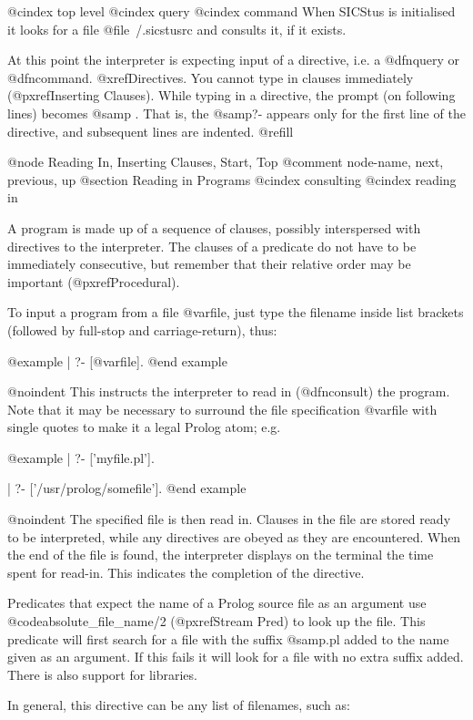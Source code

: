 @cindex top level
@cindex query
@cindex command
When SICStus is initialised it looks for a file @file{~/.sicstusrc} and
consults it, if it exists.

At this point the interpreter is expecting input of a directive, i.e. a
@dfn{query} or @dfn{command}. @xref{Directives}.  You cannot type in
clauses immediately (@pxref{Inserting Clauses}).  While typing in a
directive, the prompt (on following lines) becomes @samp{ }.  That is,
the @samp{?-} appears only for the first line of the directive, and
subsequent lines are indented. @refill

@node Reading In, Inserting Clauses, Start, Top
@comment  node-name,  next,  previous,  up
@section Reading in Programs
@cindex consulting
@cindex reading in

A program is made up of a sequence of clauses, possibly interspersed with
directives to the interpreter.  The clauses of a predicate do not have to
be immediately consecutive, but remember that their relative order may be
important (@pxref{Procedural}).

To input a program from a file @var{file}, just type the filename inside list
brackets (followed by full-stop and carriage-return), thus:

@example
| ?- [@var{file}].
@end example

@noindent
This instructs the interpreter to read in (@dfn{consult}) the program.
Note that it may be necessary to surround the file specification
@var{file} with single quotes to make it a legal Prolog atom; e.g.

@example
| ?- ['myfile.pl'].

| ?- ['/usr/prolog/somefile'].
@end example

@noindent
The specified file is then read in.  Clauses in the file are stored ready
to be interpreted, while any directives are obeyed as they are encountered.
When the end of the file is found, the interpreter displays on the terminal
the time spent for read-in.  This indicates the completion of the directive.

Predicates that expect the name of a Prolog source file as an argument
use @code{absolute_file_name/2} (@pxref{Stream Pred}) to look up the
file.  This predicate will first search for a file with the suffix
@samp{.pl} added to the name given as an argument.  If this fails it
will look for a file with no extra suffix added.  There is also support
for libraries.

In general, this directive can be any list of filenames, such as:  

